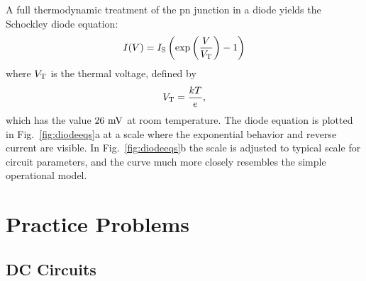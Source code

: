 \documentclass[12pt,oneside]{book}
\begin{document}
A full thermodynamic treatment of the pn junction in a diode yields the Schockley diode equation:
\begin{displaymath}
I(V) = I_{\rm S} \left( \exp\left( \frac{V}{V_{\rm T}}\right) - 1 \right)
\end{displaymath}
where $V_{\rm T}$ is the thermal voltage, defined by 
\begin{displaymath}
V_{\rm T} = \frac{kT}{e},
\end{displaymath}
which has the value $26~\rm mV$ at room temperature.  The diode equation is plotted in Fig.~\ref{fig:diodeeqs}a at a scale where the exponential behavior and reverse current are visible.  In Fig.~\ref{fig:diodeeqs}b the scale is adjusted to typical scale for circuit parameters, and the curve much more closely resembles the simple operational model. 

\appendix

\chapter{Practice Problems}

\section{DC Circuits}
\end{document}
